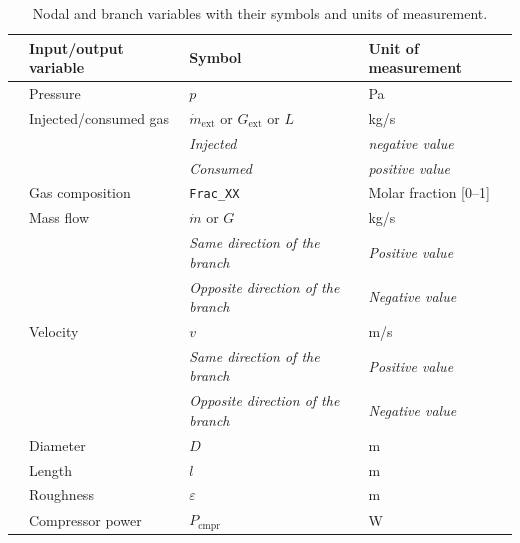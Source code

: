 \begin{table}[h!]
\centering
\renewcommand{\arraystretch}{1.25}
\setlength{\tabcolsep}{6pt}
\begin{tabular}{|>{\centering\arraybackslash}m{2.2cm}|
                >{\raggedright\arraybackslash}m{5.2cm}|
                >{\centering\arraybackslash}m{3.6cm}|
                >{\centering\arraybackslash}m{3.2cm}|}
\hline
\multicolumn{1}{|c|}{} &
\textbf{Input/output variable} &
\textbf{Symbol} &
\textbf{Unit of measurement} \\
\hline
\multirow{5}{*}{\rotatebox{90}{\textbf{Nodal variables}}}
 & Pressure & $p$ & Pa \\ \cline{2-4}
 & Injected/consumed gas & $\dot m_{\text{ext}}$ or $G_{\text{ext}}$ or $L$ & kg/s \\ \cline{3-4}
 &  & \textit{Injected} & \textit{negative value} \\ \cline{3-4}
 &  & \textit{Consumed} & \textit{positive value} \\ \cline{2-4}
 & Gas composition & \texttt{Frac\_XX} & Molar fraction [0--1] \\
\hline
\multirow{10}{*}{\rotatebox{90}{\textbf{Branch variables}}}
 & Mass flow & $\dot m$ or $G$ & kg/s \\ \cline{3-4}
 &  & \textit{Same direction of the branch} & \textit{Positive value} \\ \cline{3-4}
 &  & \textit{Opposite direction of the branch} & \textit{Negative value} \\ \cline{2-4}
 & Velocity & $v$ & m/s \\ \cline{3-4}
 &  & \textit{Same direction of the branch} & \textit{Positive value} \\ \cline{3-4}
 &  & \textit{Opposite direction of the branch} & \textit{Negative value} \\ \cline{2-4}
 & Diameter & $D$ & m \\ \cline{2-4}
 & Length & $l$ & m \\ \cline{2-4}
 & Roughness & $\varepsilon$ & m \\ \cline{2-4}
 & Compressor power & $P_{\text{cmpr}}$ & W \\
\hline
\end{tabular}
\caption{Nodal and branch variables with their symbols and units of measurement.}
\label{tab:variables}
\end{table}






